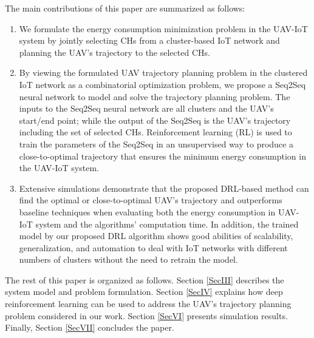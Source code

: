 \documentclass[journal]{IEEEtran}
\begin{document}
	 	The main contributions of this paper are summarized as follows:
	\begin{enumerate}
		\item We formulate the energy consumption minimization problem in the UAV-IoT system by {jointly selecting CHs from a cluster-based IoT network and planning the UAV's trajectory to the selected CHs.}
				
		\item By viewing the formulated UAV trajectory planning problem in the clustered IoT network as a {combinatorial optimization problem}, we propose a Seq2Seq neural network to model and solve the trajectory planning problem. The inputs to the Seq2Seq neural network are all clusters and the UAV's start/end point; while the output of the Seq2Seq is the UAV's trajectory including the set of selected CHs.
		Reinforcement learning (RL) is used to train the parameters of the Seq2Seq in an unsupervised way to produce a close-to-optimal trajectory that ensures the minimum energy consumption in the UAV-IoT system.
		
		\item Extensive simulations demonstrate that the proposed DRL-based method can find the optimal or close-to-optimal UAV's trajectory and outperforms baseline techniques when evaluating both the energy consumption in UAV-IoT system and the algorithms' computation time. In addition, the trained model by our proposed DRL algorithm shows {good abilities of scalability, generalization, and automation} to deal with IoT networks with different numbers of clusters without the need to retrain the model.
		
	\end{enumerate}
	
	The rest of this paper is organized as follows. Section \ref{SecIII} describes the system model and problem formulation. Section \ref{SecIV} explains how deep reinforcement learning can be used to address the UAV's trajectory planning problem considered in our work. Section \ref{SecVI} presents simulation results. Finally, Section \ref{SecVII} concludes the paper.	
	
\end{document}
